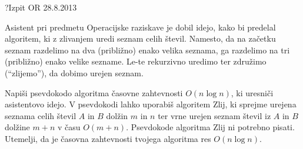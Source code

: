 \begin{naloga}{?}{Izpit OR 28.8.2013}
\begin{vprasanje}
Asistent pri predmetu Operacijske raziskave je dobil idejo,
kako bi predelal algoritem, ki z zlivanjem uredi seznam celih števil.
Namesto,
da na začetku seznam razdelimo na dva (približno) enako velika seznama,
ga razdelimo na tri (približno) enako velike sezname.
Le-te rekurzivno uredimo ter združimo (``zlijemo''), da dobimo urejen seznam.

Napiši psevdokodo algoritma časovne zahtevnosti $O(n \log n)$,
ki uresniči asistentovo idejo.
V psevdokodi lahko uporabiš algoritem {\sc Zlij},
ki sprejme urejena seznama celih števil $A$ in $B$ dolžin $m$ in $n$
ter vrne urejen seznam števil iz $A$ in $B$ dolžine $m+n$ v času $O(m+n)$.
Psevdokode algoritma {\sc Zlij} ni potrebno pisati.
Utemelji, da je časovna zahtevnosti tvojega algoritma res $O(n \log n)$.
\end{vprasanje}
\begin{odgovor}
\end{odgovor}
\end{naloga}
